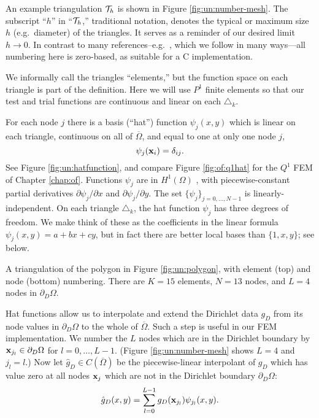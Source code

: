 An example triangulation $\mathcal{T}_h$ is shown in Figure \ref{fig:un:number-mesh}.  The subscript ``$h$'' in ``$\mathcal{T}_h$,'' traditional notation, denotes the typical or maximum size $h$ (e.g.~diameter) of the triangles.  It serves as a reminder of our desired limit $h\to 0$.  In contrast to many references--e.g.~\citet{Elmanetal2005}, which we follow in many ways---all numbering here is zero-based, as suitable for a C implementation.

We informally call the triangles ``elements,'' but the function space on each triangle is part of the definition.  Here we will use $P^1$ finite elements \citep{Elmanetal2005} so that our test and trial functions are continuous and linear on each $\triangle_k$.

For each node $j$ there is a basis (``hat'') function  $\psi_j(x,y)$ which is linear on each triangle, continuous on all of $\overline{\Omega}$, and equal to one at only one node $j$,
\begin{equation*}
\psi_j(\mathbf{x}_i) = \delta_{ij}.
\end{equation*}
See Figure \ref{fig:un:hatfunction}, and compare Figure \ref{fig:of:q1hat} for the $Q^1$ FEM of Chapter \ref{chap:of}.  Functions $\psi_j$ are in $H^1(\Omega)$ \citep{Braess2007}, with piecewise-constant partial derivatives $\partial\psi_j/\partial x$ and $\partial\psi_j/\partial y$.  The set $\{\psi_j\}_{j=0,\dots,N-1}$ is linearly-independent.  On each triangle $\triangle_k$, the hat function $\psi_j$ has three degrees of freedom.  We make think of these as the coefficients in the linear formula $\psi_j(x,y) = a + b x + c y$, but in fact there are better local bases than $\{1,x,y\}$; see below.

\begin{marginfigure}


\medskip


\caption{A triangulation of the polygon in Figure \ref{fig:un:polygon}, with element (top) and node (bottom) numbering.  There are $K=15$ elements, $N=13$ nodes, and $L=4$ nodes in $\partial_D\Omega$.}
\label{fig:un:number-mesh}
\end{marginfigure}

Hat functions allow us to interpolate and extend the Dirichlet data $g_D$ from its node values in $\partial_D \Omega$ to the whole of $\overline\Omega$.  Such a step is useful in our FEM implementation.  We number the $L$ nodes which are in the Dirichlet boundary by $\mathbf{x}_{j_l} \in \partial_D\Omega$ for $l=0,\dots,L-1$.  (Figure \ref{fig:un:number-mesh} shows $L=4$ and $j_l=l$.)  Now let $\hat g_D \in C(\overline\Omega)$ be the piecewise-linear interpolant of $g_D$ which has value zero at all nodes $\mathbf{x}_j$ which are not in the Dirichlet boundary $\partial_D \Omega$:
\begin{equation}
\hat g_D(x,y) = \sum_{l=0}^{L-1} g_D(\mathbf{x}_{j_l}) \psi_{j_l}(x,y). \label{eq:un:hatgdefine}
\end{equation}

